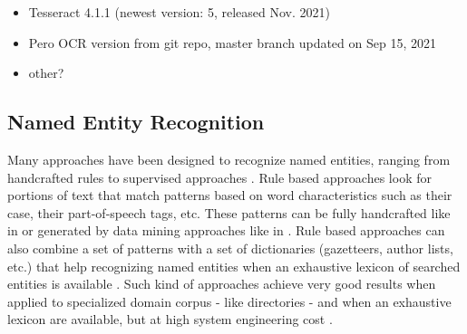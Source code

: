 \begin{itemize}
    \item Tesseract 4.1.1 (newest version: 5, released Nov. 2021)
    \item Pero OCR version from git repo, master branch updated on Sep 15, 2021 %
    \item other?  %
\end{itemize}




\subsection{Named Entity Recognition}

Many approaches have been designed to recognize named entities, ranging from handcrafted rules to supervised approaches \cite{nadeau2007}.
Rule based approaches look for portions of text that match patterns based on word characteristics such as their case, their part-of-speech tags, etc.
These patterns can be fully handcrafted like in \cite{bell2020automated} or generated by data mining approaches like in \cite{nouvel2011}.
Rule based approaches can also combine a set of patterns with a set of dictionaries (gazetteers, author lists, etc.) that help recognizing named entities when an exhaustive lexicon of searched entities is available \cite{mansouri2008,maurel2011}.
Such kind of approaches achieve very good results when applied to specialized domain corpus - like directories - and when an exhaustive lexicon are available, but at high system engineering cost \cite{nadeau2007}. 

